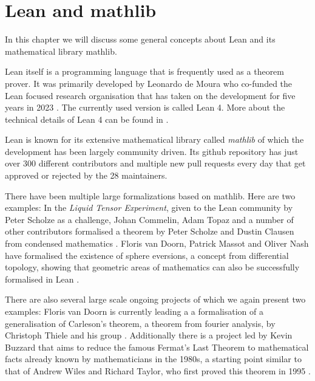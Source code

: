 \chapter{Lean and mathlib}

In this chapter we will discuss some general concepts about Lean and its mathematical library mathlib. 

Lean itself is a programming language that is frequently used as a theorem prover. 
It was primarily developed by Leonardo de Moura who co-funded the Lean focused research organisation that has taken on the development for five years in 2023 \cite{LeanFRO2024}. 
The currently used version is called Lean 4.
More about the technical details of Lean 4 can be found in \cite{deMoura2021}.

Lean is known for its extensive mathematical library called \emph{mathlib} of which the development has been largely community driven. 
Its github repository has just over 300 different contributors and multiple new pull requests every day that get approved or rejected by the 28 maintainers. 

There have been multiple large formalizations based on mathlib. 
Here are two examples: 
In the \emph{Liquid Tensor Experiment}, given to the Lean community by Peter Scholze as a challenge, Johan Commelin, Adam Topaz and a number of other contributors formalised a theorem by Peter Scholze and Dustin Clausen from condensed mathematics \cite{Commelin2022}.
Floris van Doorn, Patrick Massot and Oliver Nash have formalised the existence of sphere eversions, a concept from differential topology, showing that geometric areas of mathematics can also be successfully formalised in Lean \cite{vanDoorn2023}. 

There are also several large scale ongoing projects of which we again present two examples: 
Floris van Doorn is currently leading a a formalisation of a generalisation of Carleson's theorem, a theorem from fourier analysis, by Christoph Thiele and his group \cite{Becker2024}.
Additionally there is a project led by Kevin Buzzard that aims to reduce the famous Fermat's Last Theorem to mathematical facts already known by mathematicians in the 1980s, a starting point similar to that of Andrew Wiles and Richard Taylor, who first proved this theorem in 1995 \cite{Buzzard2024}. 




